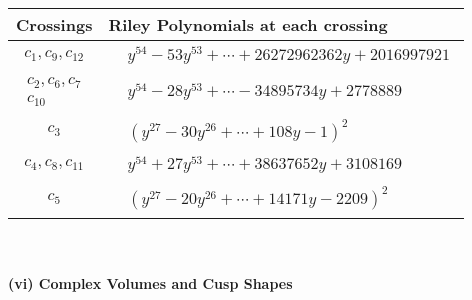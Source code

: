\documentclass[1p]{elsarticle_modified}
\theoremstyle{definition}
\begin{document}
\begin{tabular}{m{50pt}|m{274pt}}
Crossings & \hspace{64pt}Riley Polynomials at each crossing \\
\hline $$\begin{aligned}c_{1},c_{9},c_{12}\end{aligned}$$&$\begin{aligned}
&y^{54}-53 y^{53}+\cdots+26272962362 y+2016997921
\end{aligned}$\\
\hline $$\begin{aligned}c_{2},c_{6},c_{7}\\c_{10}\end{aligned}$$&$\begin{aligned}
&y^{54}-28 y^{53}+\cdots-34895734 y+2778889
\end{aligned}$\\
\hline $$\begin{aligned}c_{3}\end{aligned}$$&$\begin{aligned}
&(y^{27}-30 y^{26}+\cdots+108 y-1)^{2}
\end{aligned}$\\
\hline $$\begin{aligned}c_{4},c_{8},c_{11}\end{aligned}$$&$\begin{aligned}
&y^{54}+27 y^{53}+\cdots+38637652 y+3108169
\end{aligned}$\\
\hline $$\begin{aligned}c_{5}\end{aligned}$$&$\begin{aligned}
&(y^{27}-20 y^{26}+\cdots+14171 y-2209)^{2}
\end{aligned}$\\
\hline
\end{tabular}\\~\\
\newpage\flushleft \textbf{(vi) Complex Volumes and Cusp Shapes}
\end{document}
